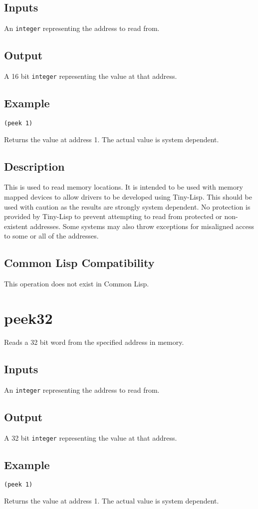 \documentclass[10pt, openany]{book}
\newcommand{\datatype}[1]{\texttt{#1}}
\newcommand{\tl}{Tiny-Lisp}
\newcommand{\cl}{Common Lisp}
\begin{document}
\subsection{Inputs}
An \datatype{integer} representing the address to read from.
\subsection{Output}
A 16 bit \datatype{integer} representing the value at that address.
\subsection{Example}
\begin{lstlisting}
(peek 1)
\end{lstlisting}
Returns the value at address 1.  The actual value is system dependent.
\subsection{Description}
This is used to read memory locations.  It is intended to be used with memory mapped devices to allow drivers to be developed using \tl{}.  This should be used with caution as the results are strongly system dependent.  No protection is provided by \tl{} to prevent attempting to read from protected or non-existent addresses.  Some systems may also throw exceptions for misaligned access to some or all of the addresses.
\subsection{Common Lisp Compatibility}
This operation does not exist in \cl.

\section{peek32}
Reads a 32 bit word from the specified address in memory.
\subsection{Inputs}
An \datatype{integer} representing the address to read from.
\subsection{Output}
A 32 bit \datatype{integer} representing the value at that address.
\subsection{Example}
\begin{lstlisting}
(peek 1)
\end{lstlisting}
Returns the value at address 1.  The actual value is system dependent.
\end{document}
